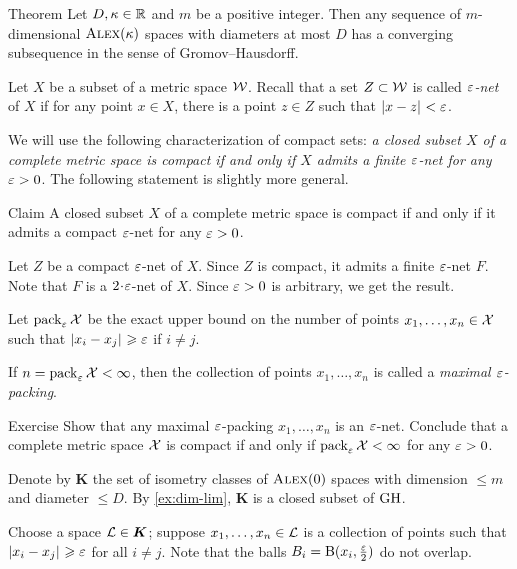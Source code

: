 \begin{thm}{Theorem}\label{thm:gromov-compactness}
Let $D,\kappa\in\mathbb{R}$ and $m$ be a positive integer. 
Then any sequence of $m$-dimensional $\textsc{Alex}(\kappa)$ spaces with diameters at most $D$
has a converging subsequence in the sense of Gromov--Hausdorff.
\end{thm}

Let $X$ be a subset of a metric space $\mathcal{W}$.
Recall that a set $Z\subset \mathcal{W}$ is called \emph{$\varepsilon$-net} of $X$ if for any point $x\in X$, there is a point $z\in Z$ such that $\dist{x}{z}{}<\eps$.

We will use the following characterization of compact sets: \textit{a closed subset $X$ of a complete metric space is compact if and only if $X$ admits a finite $\varepsilon$-net for any $\varepsilon>0$}.
The following statement is slightly more general.

\begin{thm}{Claim}\label{clm:compact-net}
A closed subset $X$ of a complete metric space is compact if and only if it admits a compact $\varepsilon$-net for any $\varepsilon>0$.
\end{thm}

Let $Z$ be a compact $\varepsilon$-net of $X$.
Since $Z$ is compact, it admits a finite $\varepsilon$-net $F$.
Note that $F$ is a $2\cdot\eps$-net of $X$.
Since $\varepsilon>0$ is arbitrary, we get the result.
\qeds

Let $\operatorname{\rm pack}\nolimits_\varepsilon\mathcal{X}$ be the exact upper bound on the number of points $x_1,\z\dots,x_n\in \spc{X}$ such that $\dist{x_i}{x_j}{}\ge\eps$ if $i\ne j$.

If $n=\operatorname{\rm pack}\nolimits_\varepsilon\mathcal{X}<\infty$, then
the collection of points $x_1,\dots,x_n$ is called a \emph{maximal $\varepsilon$-packing}.

\begin{thm}{Exercise}\label{ex:pack-net}
Show that any maximal $\varepsilon$-packing $x_1,\dots,x_n$ is an $\varepsilon$-net.
Conclude that a complete metric space $\mathcal{X}$ is compact if and only if $\pack_\eps\spc{X}\z<\infty$ for any $\varepsilon>0$.
\end{thm}


Denote by $\bm{K}$ the set of isometry classes of $\textsc{Alex}(0)$ spaces with dimension $\le m$ and diameter $\le D$.
By \ref{ex:dim-lim}, $\bm{K}$ is a closed subset of $\operatorname{\rm GH}\nolimits$.

Choose a space $\mathcal{L}\in \bm{K}$;
suppose $x_1,\dots,x_n\in \mathcal{L}$ is a collection of points such that $\dist{x_i}{x_j}{}\ge \eps$ for all $i\ne j$.
Note that the balls $B_i=\mathrm{B}{}(x_i,\tfrac{\varepsilon}2)$ do not overlap.

